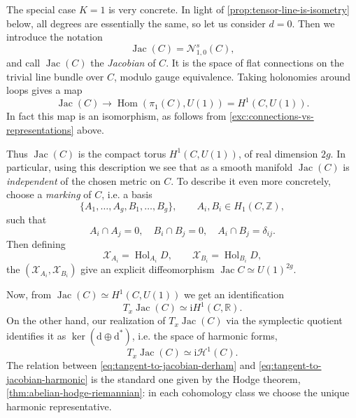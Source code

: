 \documentclass[12pt,letterpaper,reqno]{article}
\numberwithin{equation}{section}
\newcommand{\cN}{\ensuremath{\mathcal N}}
\newcommand{\cH}{\ensuremath{\mathcal H}}
\newcommand{\cX}{\ensuremath{\mathcal X}}
\newcommand{\R}{\ensuremath{\mathbb R}}
\newcommand{\Z}{\ensuremath{\mathbb Z}}
\newcommand{\I}{{\mathrm i}}
\newcommand{\de}{\mathrm{d}}
\newcommand{\ti}[1]{\textit{#1}}
\DeclareMathOperator{\Hom}{Hom}
\DeclareMathOperator{\Jac}{Jac}
\DeclareMathOperator{\Hol}{Hol}
\begin{document}
\begin{example}[Jacobians] \label{exa:jacobians}
The special case $K=1$ is very concrete. In light of
\autoref{prop:tensor-line-is-isometry} below, all degrees are
essentially the same, so let us consider $d=0$. Then we
introduce the notation
\begin{equation}
 \Jac(C) = \cN^s_{1,0}(C),
\end{equation}
and call $\Jac(C)$ the \ti{Jacobian} of $C$.
It is the space of flat connections on the trivial line
bundle over $C$, modulo gauge equivalence.
Taking holonomies around loops gives a map
\begin{equation}
  \Jac(C) \to \Hom(\pi_1(C), U(1)) = H^1(C, U(1)).
\end{equation}
In fact this map is an isomorphism, as follows from
\autoref{exc:connections-vs-representations} above.

Thus $\Jac(C)$ is the compact torus $H^1(C,U(1))$,
of real dimension $2g$.
In particular, using this description we see that
as a smooth manifold $\Jac(C)$
is \ti{independent} of the chosen metric on $C$.
To describe it even more concretely, choose a
\ti{marking} of $C$, i.e. a basis
\begin{equation}
	\{A_1, \dots, A_g, B_1, \dots, B_g \}, \qquad A_i, B_i \in H_1(C,\Z),
\end{equation}
such that
\begin{equation}
	A_i \cap A_j = 0, \quad B_i \cap B_j = 0, \quad A_i \cap B_j = \delta_{ij}.
\end{equation}
Then defining
\begin{equation}
	\cX_{A_i} = \Hol_{A_i} D, \qquad \cX_{B_i} = \Hol_{B_i} D,
\end{equation}
the $(\cX_{A_i},\cX_{B_i})$ give an explicit diffeomorphism $\Jac C \simeq U(1)^{2g}$.

Now, from $\Jac(C) \simeq H^1(C,U(1))$
we get an identification
\begin{equation} \label{eq:tangent-to-jacobian-derham}
 T_x \Jac(C) \simeq \I H^1(C,\R).
\end{equation}
On the other hand, our realization of $T_x \Jac(C)$ via the symplectic quotient
identifies it as $\ker (\de \oplus \de^*)$, i.e.
the space of harmonic forms,
\begin{equation} \label{eq:tangent-to-jacobian-harmonic}
 T_x \Jac(C) \simeq \I \cH^1(C).
\end{equation}
The relation between \eqref{eq:tangent-to-jacobian-derham}
and \eqref{eq:tangent-to-jacobian-harmonic}
is the standard one given by the Hodge theorem,
\autoref{thm:abelian-hodge-riemannian}:
in each cohomology class we choose the unique
harmonic representative.


\end{example}
\end{document}
